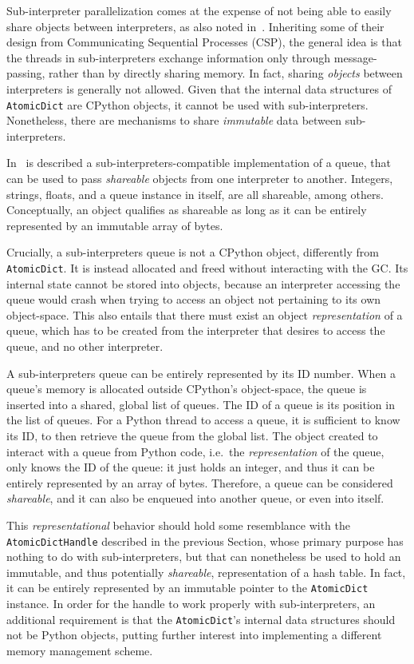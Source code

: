 Sub-interpreter parallelization comes at the expense of not being able to easily share objects between interpreters, as also noted in~\cite[{\S}Per-Interpreter GIL]{pep703}.
Inheriting some of their design from Communicating Sequential Processes (CSP), the general idea is that the threads in sub-interpreters exchange information only through message-passing, rather than by directly sharing memory.
In fact, sharing \emph{objects} between interpreters is generally not allowed.
Given that the internal data structures of \texttt{AtomicDict} are CPython objects, it cannot be used with sub-interpreters.
Nonetheless, there are mechanisms to share \emph{immutable} data between sub-interpreters.

In~\cite[\S Queue Objects]{pep734} is described a sub-interpreters-compatible implementation of a queue, that can be used to pass \emph{shareable} objects from one interpreter to another.
Integers, strings, floats, and a queue instance in itself, are all shareable, among others.
Conceptually, an object qualifies as shareable as long as it can be entirely represented by an immutable array of bytes.

Crucially, a sub-interpreters queue is not a CPython object, differently from \texttt{AtomicDict}.
It is instead allocated and freed without interacting with the GC\@.
Its internal state cannot be stored into objects, because an interpreter accessing the queue would crash when trying to access an object not pertaining to its own object-space.
This also entails that there must exist an object \emph{representation} of a queue, which has to be created from the interpreter that desires to access the queue, and no other interpreter.

A sub-interpreters queue can be entirely represented by its ID number.
When a queue's memory is allocated outside CPython's object-space, the queue is inserted into a shared, global list of queues.
The ID of a queue is its position in the list of queues.
For a Python thread to access a queue, it is sufficient to know its ID, to then retrieve the queue from the global list.
The object created to interact with a queue from Python code, i.e.\ the \emph{representation} of the queue, only knows the ID of the queue: it just holds an integer, and thus it can be entirely represented by an array of bytes.
Therefore, a queue can be considered \emph{shareable}, and it can also be enqueued into another queue, or even into itself.

This \emph{representational} behavior should hold some resemblance with the \texttt{Atom\-icDictHandle} described in the previous Section, whose primary purpose has nothing to do with sub-interpreters, but that can nonetheless be used to hold an immutable, and thus potentially \emph{shareable}, representation of a hash table.
In fact, it can be entirely represented by an immutable pointer to the \texttt{AtomicDict} instance.
In order for the handle to work properly with sub-interpreters, an additional requirement is that the \texttt{AtomicDict}'s internal data structures should not be Python objects, putting further interest into implementing a different memory management scheme.

